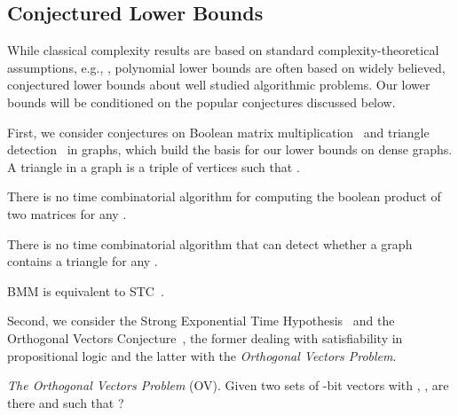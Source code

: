 \documentclass[11pt,letterpaper]{article}
\newif\iffullversion
\newcommand{\infull}[1]{\iffullversion #1\fi}
\newcommand{\inshort}[1]{\iffullversion \else #1\fi}
\begin{document}
\subsection{Conjectured Lower Bounds}\label{sec:conjectures}

While classical complexity results are based on standard complexity-theoretical assumptions,
e.g., , polynomial lower bounds are often based on widely believed,
conjectured lower bounds 
about well studied algorithmic problems.
Our lower bounds will be conditioned on the popular conjectures discussed below.

First, we consider conjectures on Boolean matrix multiplication~\cite{WilliamsW10,AbboudW14} and 
triangle detection~\cite{AbboudW14} in graphs, which build the basis for our lower bounds on dense graphs. A triangle in a graph is a triple  of vertices 
such that .

\begin{conjecture}\label{conj:bmm}
There is no  time combinatorial algorithm for computing the boolean product of 
two  matrices for any .
\end{conjecture}

\begin{conjecture}\label{conj:triangle}
There is \infull{no   expected time algorithm and }no
 time combinatorial algorithm that can detect whether a graph contains a triangle for any \infull{, 
where  is the matrix multiplication exponent}. 
\end{conjecture}

\inshort{BMM is equivalent to STC~\cite{WilliamsW10}.}
\infull{By a result of Vassilevska~Williams and Ryan Williams~\cite{WilliamsW10}, we have that 
BMM is equivalent to the combinatorial part of STC.} 
\infull{Moreover, if we do not restrict ourselves to combinatorial algorithms, STC still gives a super-linear lower bound.}

Second, we consider the Strong Exponential Time Hypothesis~\cite{ImpagliazzoPZ01,CalabroIP09}
and the Orthogonal Vectors Conjecture~\cite{AbboudWW15}, the former dealing with satisfiability in propositional logic and the latter with 
the \emph{Orthogonal Vectors Problem}.

\emph{The Orthogonal Vectors Problem} (OV). Given two sets  of -bit 
vectors with , , are there  
and  such that ?
\end{document}
